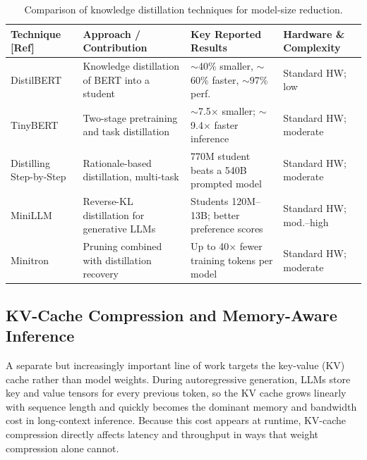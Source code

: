 \documentclass[
11pt, %
english, %
singlespacing, %
headsepline, %
]{MastersDoctoralThesis} %
\begin{document}
\begin{table}[htbp]
\centering
\scriptsize
\caption{Comparison of knowledge distillation techniques for model-size reduction.}
\label{tab:lr-kd}
\renewcommand{\arraystretch}{1.2}
\begin{tabular}{p{}p{}p{}p{}}
\hline
\textbf{Technique [Ref]} & \textbf{Approach / Contribution} & \textbf{Key Reported Results} & \textbf{Hardware \& Complexity} \\
\hline
DistilBERT \cite{sanh2020distilbert} & Knowledge distillation of BERT into a student & $\sim$40\% smaller, $\sim$60\% faster, $\sim$97\% perf. & Standard HW; low \\
TinyBERT \cite{jiao2020tinybert} & Two-stage pretraining and task distillation & $\sim$7.5$\times$ smaller; $\sim$9.4$\times$ faster inference & Standard HW; moderate \\
Distilling Step-by-Step \cite{hsieh2023distilling} & Rationale-based distillation, multi-task & 770M student beats a 540B prompted model & Standard HW; moderate \\
MiniLLM \cite{gu2024minillm} & Reverse-KL distillation for generative LLMs & Students 120M--13B; better preference scores & Standard HW; mod.--high \\
Minitron \cite{muralidharan2024minitron} & Pruning combined with distillation recovery & Up to 40$\times$ fewer training tokens per model & Standard HW; moderate \\
\hline
\end{tabular}
\end{table}

\subsection{KV-Cache Compression and Memory-Aware Inference}

A separate but increasingly important line of work targets the key-value (KV) cache rather than model weights. During autoregressive generation, LLMs store key and value tensors for every previous token, so the KV cache grows linearly with sequence length and quickly becomes the dominant memory and bandwidth cost in long-context inference. Because this cost appears at runtime, KV-cache compression directly affects latency and throughput in ways that weight compression alone cannot.
\end{document}
